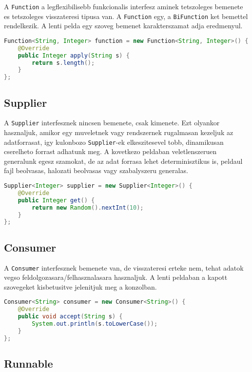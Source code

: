 \documentclass{article}
\let\l\lstinline
\begin{document}
A \l{Function} a legflexibilisebb funkcionalis interfesz aminek tetszoleges bemenete es tetszoleges visszateresi tipusa van. A \l{Function} egy, a \l{BiFunction} ket bemettel rendelkezik. A lenti pelda egy szoveg bemenet karakterszamat adja eredmenyul.

\begin{lstlisting}[language=Java, caption=Pelda Function]
Function<String, Integer> function = new Function<String, Integer>() {
	@Override
	public Integer apply(String s) {
		return s.length();
	}
};
\end{lstlisting}

\subsection{Supplier}

A \l{Supplier} interfesznek nincsen bemenete, csak kimenete. Ezt olyankor hasznaljuk, amikor egy muveletnek vagy rendszernek rugalmasan kezeljuk az adatforrasat, igy kulonbozo \l{Supplier}-ek elkeszitesevel tobb, dinamikusan cserelheto forrast adhatunk meg. A kovetkezo peldaban veletlenszeruen generalunk egesz szamokat, de az adat forrasa lehet determinisztikus is, peldaul fajl beolvasas, halozati beolvasas vagy szabalyszeru generalas.

\begin{lstlisting}[language=Java, caption=Pelda Supplier]
Supplier<Integer> supplier = new Supplier<Integer>() {
	@Override
	public Integer get() {
		return new Random().nextInt(10);
	}
};
\end{lstlisting}

\subsection{Consumer}
A \l{Consumer} interfesznek bemenete van, de visszateresi erteke nem, tehat adatok vegso feldolgozasara/felhasznalasara hasznaljuk. A lenti peldaban a kapott szovegeket kisbetusitve jelenitjuk meg a konzolban.

\begin{lstlisting}[language=Java, caption=Pelda Consumer]
Consumer<String> consumer = new Consumer<String>() {
	@Override
	public void accept(String s) {
		System.out.println(s.toLowerCase());
	}
};
\end{lstlisting}

\subsection{Runnable}
\end{document}
